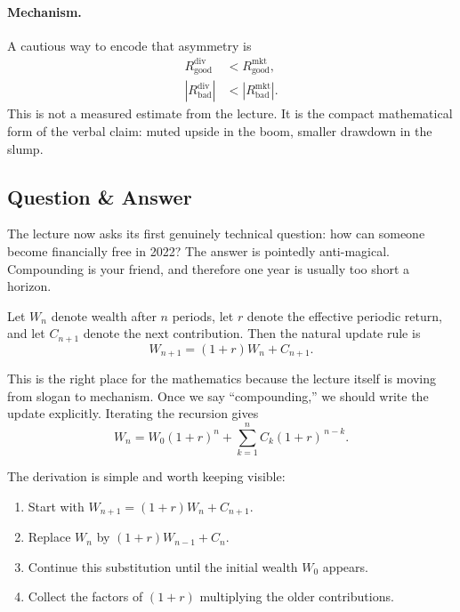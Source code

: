 \paragraph{Mechanism.}
A cautious way to encode that asymmetry is
\begin{align}
R_{\text{good}}^{\text{div}} &< R_{\text{good}}^{\text{mkt}}, \\
\left|R_{\text{bad}}^{\text{div}}\right| &< \left|R_{\text{bad}}^{\text{mkt}}\right|.
\end{align}
This is not a measured estimate from the lecture. It is the compact mathematical form of the verbal claim: muted upside in the boom, smaller drawdown in the slump.

\subsection{Question \& Answer}

The lecture now asks its first genuinely technical question: how can someone become financially free in 2022? The answer is pointedly anti-magical. Compounding is your friend, and therefore one year is usually too short a horizon.

Let \(W_n\) denote wealth after \(n\) periods, let \(r\) denote the effective periodic return, and let \(C_{n+1}\) denote the next contribution. Then the natural update rule is
\begin{equation}
W_{n+1} = (1+r)W_n + C_{n+1}.
\end{equation}

This is the right place for the mathematics because the lecture itself is moving from slogan to mechanism. Once we say ``compounding,'' we should write the update explicitly. Iterating the recursion gives
\begin{equation}
W_n = W_0(1+r)^n + \sum_{k=1}^{n} C_k(1+r)^{\,n-k}.
\end{equation}

The derivation is simple and worth keeping visible:
\begin{enumerate}
\item Start with \(W_{n+1} = (1+r)W_n + C_{n+1}\).
\item Replace \(W_n\) by \((1+r)W_{n-1} + C_n\).
\item Continue this substitution until the initial wealth \(W_0\) appears.
\item Collect the factors of \((1+r)\) multiplying the older contributions.
\end{enumerate}

